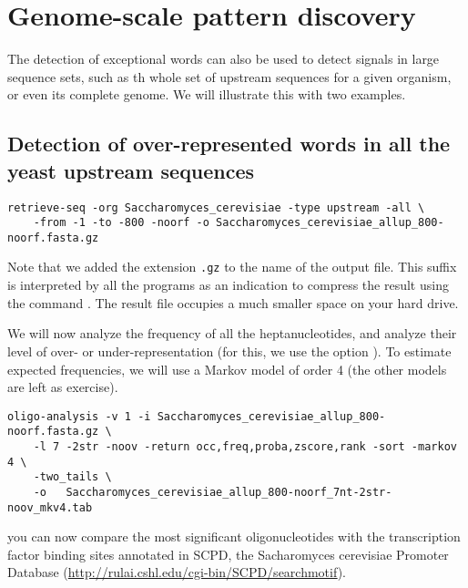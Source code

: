 \section{Genome-scale pattern discovery}

The detection of exceptional words can also be used to detect signals
in large sequence sets, such as th whole set of upstream sequences for
a given organism, or even its complete genome. We will illustrate this
with two examples.

\subsection{Detection of over-represented words in all the yeast
  upstream   sequences}

{\color{Blue} \begin{footnotesize} 
\begin{verbatim}
retrieve-seq -org Saccharomyces_cerevisiae -type upstream -all \
    -from -1 -to -800 -noorf -o Saccharomyces_cerevisiae_allup_800-noorf.fasta.gz
\end{verbatim} \end{footnotesize}
}

Note that we added the extension \texttt{.gz} to the name of the
output file. This suffix is interpreted by all the \RSAT programs as
an indication to compress the result using the command
. The result file occupies a much smaller space on your
hard drive.

We will now analyze the frequency of all the heptanucleotides, and
analyze their level of over- or under-representation (for this, we use
the option \option{-two\_tails}). To estimate expected frequencies, we
will use a Markov model of order 4 (the other models are left as
exercise).

{\color{Blue} \begin{footnotesize} 
\begin{verbatim}
oligo-analysis -v 1 -i Saccharomyces_cerevisiae_allup_800-noorf.fasta.gz \
    -l 7 -2str -noov -return occ,freq,proba,zscore,rank -sort -markov 4 \
    -two_tails \
    -o   Saccharomyces_cerevisiae_allup_800-noorf_7nt-2str-noov_mkv4.tab
\end{verbatim} \end{footnotesize}
}

you can now compare the most significant oligonucleotides with the
transcription factor binding sites annotated in SCPD, the Sacharomyces
cerevisiae Promoter Database
(\url{http://rulai.cshl.edu/cgi-bin/SCPD/searchmotif}).


